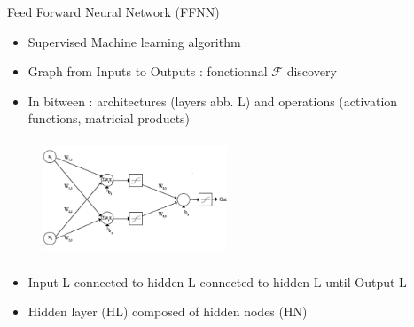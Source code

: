\documentclass[10pt,
			   xcolor=svgnames,
			   hyperref={linkcolor=red, citecolor = DarkGreen, colorlinks=true, urlcolor=Navy}] {beamer}
\newcommand{\warrow}{\item[\color{blue!50!black!70} \tiny{\ding{109}}]}
\newcommand{\sarrow}{\item[\color{blue!50!black!70!orange!60} \tiny{\ding{55}}]}
\begin{document}
\begin{frame}{Feed Forward Neural Network (FFNN)}
		\begin{itemize}
			\warrow Supervised Machine learning algorithm
			\warrow Graph from Inputs to Outputs : fonctionnal $\mathcal{F}$  discovery
			\warrow In bitween : architectures (layers abb. L) and operations (activation functions, matricial products)
		\end{itemize}

	\begin{multicols}{2}
	\noindent 
	
	\begin{figure}[!ht]
		\centering
		\includegraphics[width=5.5cm, height=3.5cm]{Multi-layer-perceptron.png}	
	\end{figure}	
	
	\columnbreak

		\begin{itemize}
			\sarrow Input L connected to hidden L connected to hidden L until Output L
			\sarrow Hidden layer (HL) composed of hidden nodes (HN)			
		\end{itemize}	
	\end{multicols}

\end{frame}
\end{document}
